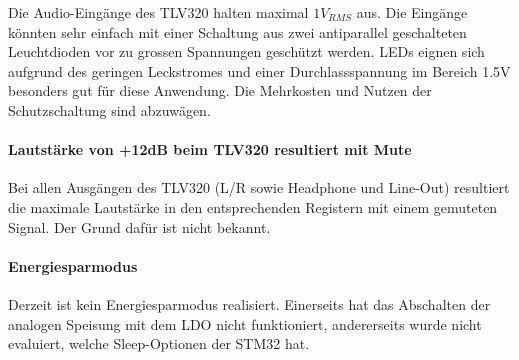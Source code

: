Die Audio-Eingänge des TLV320 halten maximal $1\si{V_{RMS}}$ aus. Die Eingänge könnten sehr einfach mit einer Schaltung aus zwei antiparallel geschalteten Leuchtdioden vor zu grossen Spannungen geschützt werden. LEDs eignen sich aufgrund des geringen Leckstromes und einer Durchlassspannung im Bereich 1.5V besonders gut für diese Anwendung.
Die Mehrkosten und Nutzen der Schutzschaltung sind abzuwägen.

\paragraph{Lautstärke von +12dB beim TLV320 resultiert mit Mute}

Bei allen Ausgängen des TLV320 (L/R sowie Headphone und Line-Out) resultiert die maximale Lautstärke in den entsprechenden Registern mit einem gemuteten Signal.
Der Grund dafür ist nicht bekannt.

\paragraph{Energiesparmodus}

Derzeit ist kein Energiesparmodus realisiert. Einerseits hat das Abschalten der analogen Speisung mit dem LDO nicht funktioniert, andererseits wurde nicht evaluiert, welche Sleep-Optionen der STM32 hat.





